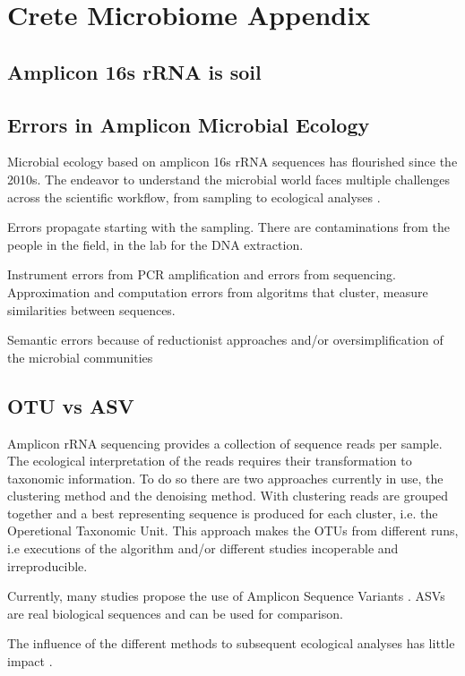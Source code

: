 
\chapter{Crete Microbiome Appendix} %

\label{AppendixC} 

\section{Amplicon 16s rRNA is soil}

\section{Errors in Amplicon Microbial Ecology}

Microbial ecology based on amplicon 16s rRNA sequences has flourished since the
2010s. The endeavor to understand the microbial world faces multiple challenges
across the scientific workflow, from sampling to ecological analyses \cite{Lee2012}.

Errors propagate starting with the sampling. There are contaminations from the
people in the field, in the lab for the DNA extraction. 

Instrument errors from PCR amplification and errors from sequencing.
Approximation and computation errors from algoritms that cluster, measure similarities between
sequences.

Semantic errors because of reductionist approaches and/or oversimplification
of the microbial communities

\section{OTU vs ASV}

Amplicon rRNA sequencing provides a collection of sequence reads per sample. 
The ecological interpretation of the reads requires their transformation to
taxonomic information. To do so there are two approaches currently in use, 
the clustering method and the denoising method. With clustering reads are 
grouped together and a best representing sequence is produced for each 
cluster, i.e. the Operetional Taxonomic Unit. This approach makes the OTUs 
from different runs, i.e executions of the algorithm and/or different studies
incoperable and irreproducible.

Currently, many studies propose the use of Amplicon Sequence Variants \cite{Callahan2017}. 
ASVs are real biological sequences and can be used for comparison.

The influence of the different methods to subsequent ecological analyses has
little impact \cite{Glassman2018}.

